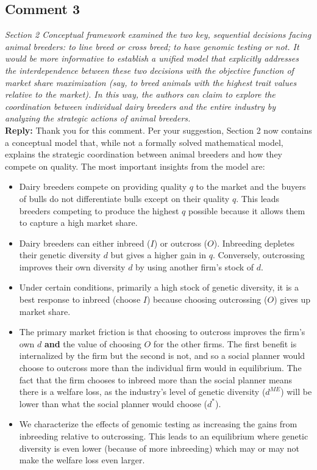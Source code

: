 \documentclass[12pt,letterpaper]{article}
\begin{document}
\subsection*{Comment 3}
{\it Section 2 Conceptual framework examined the two key, sequential decisions facing animal breeders: to line breed or cross breed; to have genomic testing or not. It would be more informative to establish a unified model that explicitly addresses the interdependence between these two decisions with the objective function of market share maximization (say, to breed animals with the highest trait values relative to the market).
In this way, the authors can claim to explore the coordination between individual dairy breeders and the entire industry by analyzing the strategic actions of animal breeders.} \\ 

\textbf{Reply:} Thank you for this comment. Per your suggestion, Section 2 now contains a conceptual model that, while not a formally solved mathematical model, explains the strategic coordination between animal breeders and how they compete on quality. The most important insights from the model are:
\begin{itemize}
\item Dairy breeders compete on providing quality $q$ to the market and the buyers of bulls do not differentiate bulls except on their quality $q$. This leads breeders competing to produce the highest $q$ possible because it allows them to capture a high market share.
\item Dairy breeders can either inbreed ($I$) or outcross ($O$). Inbreeding depletes their genetic diversity $d$ but gives a higher gain in $q$. Conversely, outcrossing improves their own diversity $d$ by using another firm's stock of $d$.
\item Under certain conditions, primarily a high stock of genetic diversity, it is a best response to inbreed (choose $I$) because choosing outcrossing ($O$) gives up market share.
\item The primary market friction is that choosing to outcross improves the firm's own $d$ \textbf{and} the value of choosing $O$ for the other firms. The first benefit is internalized by the firm but the second is not, and so a social planner would choose to outcross more than the individual firm would in equilibrium. The fact that the firm chooses to inbreed more than the social planner means there is a welfare loss, as the industry's level of genetic diversity ($d^{ME}$) will be lower than what the social planner would choose ($d^*$).
\item We characterize the effects of genomic testing as increasing the gains from inbreeding relative to outcrossing. This leads to an equilibrium where genetic diversity is even lower (because of more inbreeding) which may or may not make the welfare loss even larger.
\end{itemize}
\end{document}
